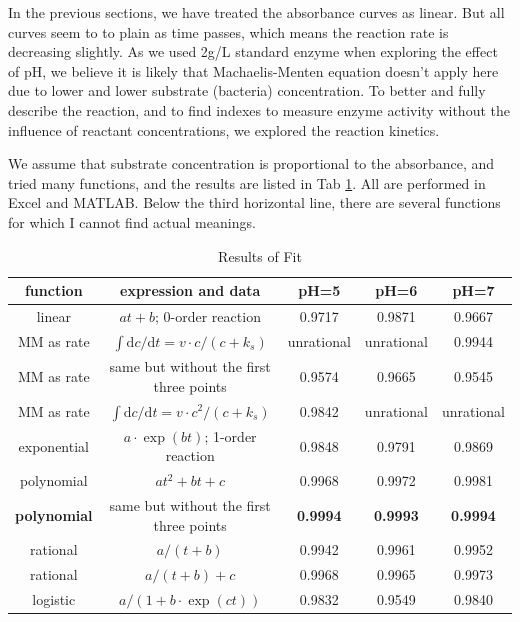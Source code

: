In the previous sections, we have treated the absorbance curves as linear. But all curves seem to to plain as time passes, which means the reaction rate is decreasing slightly. As we used 2g/L standard enzyme when exploring the effect of pH, we believe it is likely that Machaelis-Menten equation doesn't apply here due to lower and lower substrate (bacteria) concentration. To better and fully describe the reaction, and to find indexes to measure enzyme activity without the influence of reactant concentrations, we explored the reaction kinetics.

We assume that substrate concentration is proportional to the absorbance, and tried many functions, and the results are listed in Tab \ref{tab:fit}. All are performed in Excel and MATLAB. Below the third horizontal line, there are several functions for which I cannot find actual meanings.

\begin{table}[!h]
	\centering
	\caption{Results of Fit}
	\begin{tabular}{ccccc}
		\toprule
		function & expression and data & pH=5 & pH=6 & pH=7 \\
		\midrule
		linear & $at+b$; 0-order reaction & 0.9717  & 0.9871  & 0.9667  \\
		MM as rate & $\int \mathrm{d}c/\mathrm{d}t=v\cdot c/(c+k_s)$ & unrational & unrational & 0.9944  \\
		MM as rate & same but without the first three points & 0.9574  & 0.9665  & 0.9545  \\
		MM as rate & $\int \mathrm{d}c/\mathrm{d}t=v\cdot c^2/(c+k_s)$ & 0.9842  & unrational & unrational \\
		exponential & $a\cdot \exp(bt)$; 1-order reaction & 0.9848  & 0.9791  & 0.9869  \\
		\midrule
		polynomial & $at^2+bt+c$ & 0.9968  & 0.9972  & 0.9981  \\
		\textbf{polynomial} & same but without the first three points & \textbf{0.9994}  & \textbf{0.9993}  & \textbf{0.9994} \\
		rational & $a/(t+b)$ & 0.9942  & 0.9961  & 0.9952  \\
		rational & $a/(t+b)+c$ & 0.9968  & 0.9965  & 0.9973  \\
		logistic & $a/(1+b\cdot \exp(ct))$ & 0.9832  & 0.9549  & 0.9840  \\
		\bottomrule
	\end{tabular}%
	\label{tab:fit}%
\end{table}%

